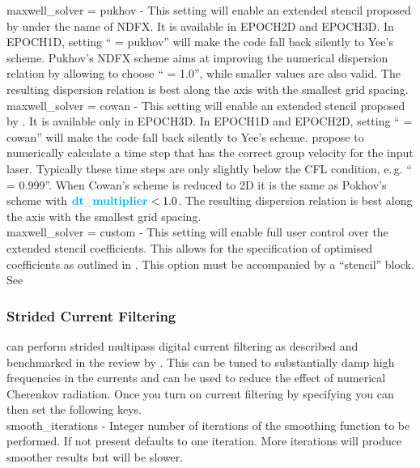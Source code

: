 {\emphtext maxwell\_solver = pukhov} - This setting will enable an extended
stencil proposed by \citet{Pukhov1999} under the name of NDFX.
It is available in EPOCH2D and EPOCH3D. In EPOCH1D, setting
`` = pukhov'' will make the code fall back silently
to Yee's scheme. Pukhov's NDFX scheme aims at improving the
numerical dispersion relation by allowing to choose
`` = 1.0'', while smaller values are also valid.
The resulting dispersion relation is best along the axis with the smallest grid
spacing.\\

{\emphtext maxwell\_solver = cowan} - This setting will enable an extended
stencil proposed by \citet{Cowan2013}. It is available only in EPOCH3D. In
EPOCH1D and EPOCH2D, setting `` = cowan'' will make
the code fall back silently to Yee's scheme.
\citet{Cowan2013} propose to numerically calculate a time step that has the
correct group velocity for the input laser. Typically these time
steps are only slightly below the CFL condition, e.\,g.
`` = 0.999''.
When Cowan's scheme is reduced to 2D it is the same as Pokhov's scheme with
$\inlineemph{dt\_multiplier}<1.0$.
The resulting dispersion relation is best along the axis with the smallest grid
spacing.\\

{\emphtext maxwell\_solver = custom} - This setting will enable full user
control over the extended stencil coefficients. This allows for the
specification of optimised coefficients as outlined in \citet{Blinne2017}.
This option must be accompanied by a ``stencil'' block.
See~\\


\subsubsection{Strided Current Filtering}
\label{sec:strided_filtering}
{\EPOCH} can perform strided multipass digital current filtering as described
and benchmarked in the review by \citet{Vay2014}. This can be tuned to
substantially damp high frequencies in the currents and can be used to reduce
the effect of numerical Cherenkov radiation. Once you turn on current
filtering by specifying  you can then set the
following keys.\\

{\emphtext smooth\_iterations} - Integer number of iterations of the smoothing
  function to be performed. If not present defaults to one iteration. More
  iterations will produce smoother results but will be slower.\\

